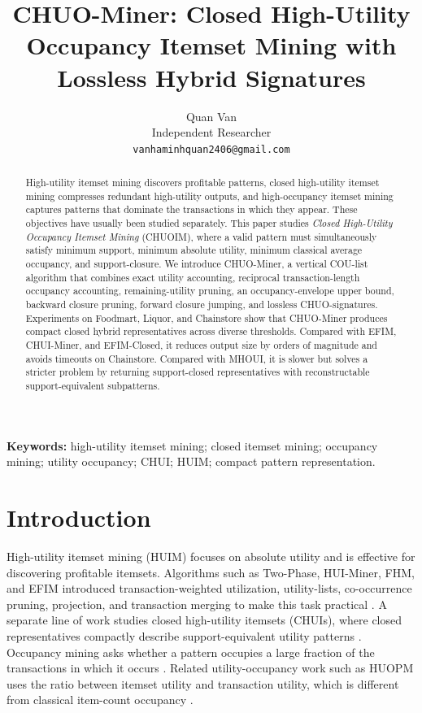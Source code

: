 \documentclass[11pt,a4paper]{article}
\title{\textbf{CHUO-Miner: Closed High-Utility Occupancy Itemset Mining with Lossless Hybrid Signatures}}
\author{
Quan Van\\
Independent Researcher\\
\texttt{vanhaminhquan2406@gmail.com}
}
\date{}
\begin{document}
\maketitle

\begin{abstract}
High-utility itemset mining discovers profitable patterns, closed high-utility itemset mining compresses redundant high-utility outputs, and high-occupancy itemset mining captures patterns that dominate the transactions in which they appear. These objectives have usually been studied separately. This paper studies \emph{Closed High-Utility Occupancy Itemset Mining} (CHUOIM), where a valid pattern must simultaneously satisfy minimum support, minimum absolute utility, minimum classical average occupancy, and support-closure. We introduce CHUO-Miner, a vertical COU-list algorithm that combines exact utility accounting, reciprocal transaction-length occupancy accounting, remaining-utility pruning, an occupancy-envelope upper bound, backward closure pruning, forward closure jumping, and lossless CHUO-signatures. Experiments on Foodmart, Liquor, and Chainstore show that CHUO-Miner produces compact closed hybrid representatives across diverse thresholds. Compared with EFIM, CHUI-Miner, and EFIM-Closed, it reduces output size by orders of magnitude and avoids timeouts on Chainstore. Compared with MHOUI, it is slower but solves a stricter problem by returning support-closed representatives with reconstructable support-equivalent subpatterns.
\end{abstract}

\noindent\textbf{Keywords:}
high-utility itemset mining; closed itemset mining; occupancy mining; utility occupancy; CHUI; HUIM; compact pattern representation.

\section{Introduction}

High-utility itemset mining (HUIM) focuses on absolute utility and is effective for discovering profitable itemsets. Algorithms such as Two-Phase, HUI-Miner, FHM, and EFIM introduced transaction-weighted utilization, utility-lists, co-occurrence pruning, projection, and transaction merging to make this task practical \cite{Liu2005TwoPhase,Liu2012HUIMiner,FournierViger2014FHM,Zida2017EFIM}. A separate line of work studies closed high-utility itemsets (CHUIs), where closed representatives compactly describe support-equivalent utility patterns \cite{Wu2015CHUIMiner}. Occupancy mining asks whether a pattern occupies a large fraction of the transactions in which it occurs \cite{Deng2020HOI}. Related utility-occupancy work such as HUOPM uses the ratio between itemset utility and transaction utility, which is different from classical item-count occupancy \cite{Gan2020HUOPM}.
\end{document}
